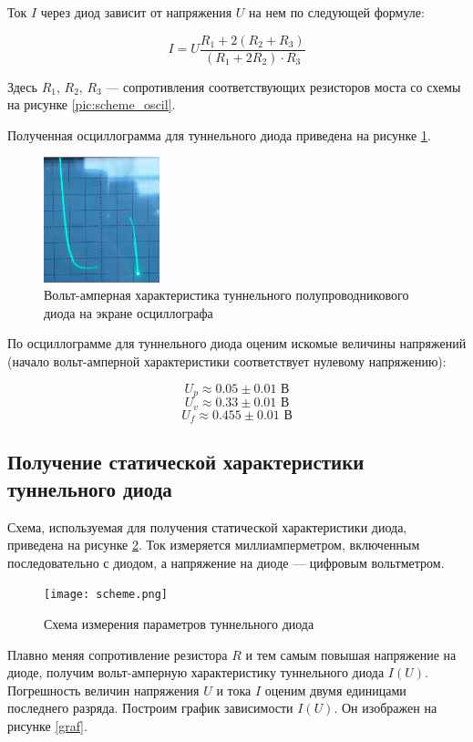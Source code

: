 \documentclass[a4paper,12pt]{report}
\begin{document}
Ток $I$ через диод зависит от напряжения $U$ на нем по следующей формуле: 
	
\[ I = U \frac{R_1 + 2(R_2 + R_3)}{(R_1 + 2R_2) \cdot R_3} \]
	
Здесь $R_1$, $R_2$, $R_3$ --- сопротивления соответствующих резисторов моста со схемы на рисунке \ref{pic:scheme_oscil}. 
	
Полученная осциллограмма для туннельного диода приведена на рисунке \ref{pic:tunnel_oscil}. 
	
\begin{figure}[H]
    \centering	
    \includegraphics[width=0.3\textwidth]{oscill.jpg}
    \caption{Вольт-амперная характеристика туннельного полупроводникового диода на экране осциллографа}
    \label{pic:tunnel_oscil}
\end{figure}
	
По осциллограмме для туннельного диода оценим искомые величины напряжений (начало вольт-амперной характеристики соответствует нулевому напряжению): 
	
\[ U_p \approx 0.05 \pm  0.01 \text{ В} \]
\[ U_v \approx  0.33 \pm 0.01 \text{ В} \]
\[ U_f \approx  0.455 \pm 0.01 \text{ В} \]	

\subsection*{Получение статической характеристики туннельного диода}

Схема, используемая для получения статической характеристики диода, приведена на рисунке \ref{pic:scheme}. Ток измеряется миллиамперметром, включенным последовательно с диодом, а напряжение на диоде --- цифровым вольтметром.

\begin{figure}[H]
    \centering	
    \texttt{[image: scheme.png]}
    \caption{Схема измерения параметров туннельного диода}
    \label{pic:scheme}
\end{figure}

Плавно меняя сопротивление резистора $ R $ и тем самым повышая напряжение на диоде, получим вольт-амперную характеристику туннельного диода $I(U)$. Погрешность величин напряжения $U$ и тока $I$ оценим двумя единицами последнего разряда. Построим график зависимости $I(U)$. Он изображен на рисунке \ref{graf}. 
\end{document}
